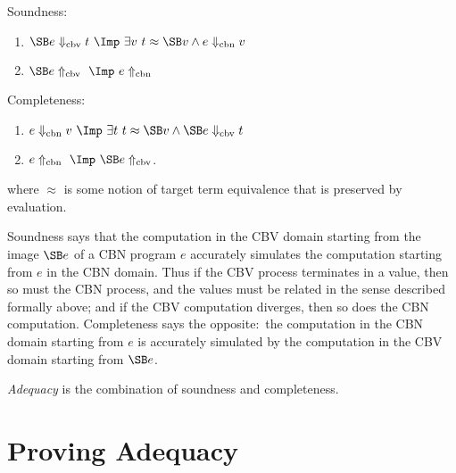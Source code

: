 \textsf{Soundness:}
\begin{enumerate}
\romanize
\item
$\SB e\Downarrow_{\mathrm{cbv}} t\ \Imp\ \exists v\ t\approx\SB v \wedge e\Downarrow_{\mathrm{cbn}} v$
\item
$\SB e\Uparrow_{\mathrm{cbv}}\ \Imp\ e\Uparrow_{\mathrm{cbn}}$
\end{enumerate}
\textsf{Completeness:}
\begin{enumerate}
\romanize
\item
$e\Downarrow_{\mathrm{cbn}} v\ \Imp\ \exists t\ t\approx\SB v \wedge \SB e\Downarrow_{\mathrm{cbv}} t$
\item
$e\Uparrow_{\mathrm{cbn}}\ \Imp\ \SB e\Uparrow_{\mathrm{cbv}}$.
\end{enumerate}
%
where $\approx$ is some notion of target term equivalence that is preserved by evaluation.

Soundness says that the computation in the CBV domain starting from the image $\SB e$ of a CBN program $e$ accurately simulates the computation starting from $e$ in the CBN domain. Thus if the CBV process terminates in a value, then so must the CBN process, and the values must be related in the sense described formally above; and if the CBV computation diverges, then so does the CBN computation. Completeness says the opposite:\ the computation in the CBN domain starting from $e$ is accurately simulated by the computation in the CBV domain starting from $\SB e$.

\emph{Adequacy} is the combination of soundness and completeness.

\section{Proving Adequacy}


